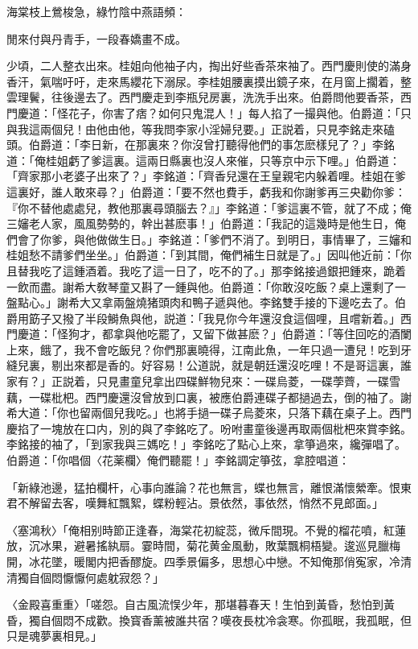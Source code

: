 海棠枝上鶯梭急，綠竹陰中燕語頻：　

閒來付與丹青手，一段春嬌畫不成。

少頃，二人整衣出來。桂姐向他袖子内，掏出好些香茶來袖了。西門慶則使的滿身香汗，氣喘吁吁，走來馬纓花下溺尿。李桂姐腰裏摸出鏡子來，在月窗上擱着，整雲理鬢，往後邊去了。西門慶走到李瓶兒房裏，洗洗手出來。伯爵問他要香茶，西門慶道：「怪花子，你害了痞？如何只鬼混人！」每人掐了一撮與他。伯爵道：「只與我這兩個兒！由他由他，等我問李家小淫婦兒要。」正説着，只見李銘走來磕頭。伯爵道：「李日新，在那裏來？你沒曾打聽得他們的事怎麽樣兒了？」李銘道：「俺桂姐虧了爹這裏。這兩日縣裏也沒人來催，只等京中示下哩。」伯爵道：「齊家那小老婆子出來了？」李銘道：「齊香兒還在王皇親宅内躲着哩。桂姐在爹這裏好，誰人敢來尋？」伯爵道：「要不然也費手，虧我和你謝爹再三央勸你爹：『你不替他處處兒，教他那裏尋頭腦去？』」李銘道：「爹這裏不管，就了不成；俺三嬸老人家，風風勢勢的，幹出甚麽事！」伯爵道：「我記的這幾時是他生日，俺們會了你爹，與他做做生日。」李銘道：「爹們不消了。到明日，事情畢了，三嬸和桂姐愁不請爹們坐坐。」伯爵道：「到其間，俺們補生日就是了。」因叫他近前：「你且替我吃了這鍾酒着。我吃了這一日了，吃不的了。」那李銘接過銀把鍾來，跪着一飲而盡。謝希大敎琴童又斟了一鍾與他。伯爵道：「你敢沒吃飯？桌上還剩了一盤點心。」謝希大又拿兩盤燒猪頭肉和鴨子遞與他。李銘雙手接的下邊吃去了。伯爵用筯子又撥了半段鰣魚與他，説道：「我見你今年還沒食這個哩，且嚐新着。」西門慶道：「怪狗才，都拿與他吃罷了，又留下做甚麽？」伯爵道：「等住回吃的酒闌上來，餓了，我不會吃飯兒？你們那裏曉得，江南此魚，一年只過一遭兒！吃到牙縫兒裏，剔出來都是香的。好容易！公道説，就是朝廷還沒吃哩！不是哥這裏，誰家有？」正説着，只見畫童兒拿出四碟鮮物兒來：一碟烏菱，一碟荸薺，一碟雪藕，一碟枇杷。西門慶還沒曾放到口裏，被應伯爵連碟子都撾過去，倒的袖了。謝希大道：「你也留兩個兒我吃。」也將手撾一碟子烏菱來，只落下藕在桌子上。西門慶掐了一塊放在口内，別的與了李銘吃了。吩咐畫童後邊再取兩個枇杷來賞李銘。李銘接的袖了，「到家我與三媽吃！」李銘吃了點心上來，拿箏過來，纔彈唱了。伯爵道：「你唱個〈花薬欄〉俺們聽罷！」李銘調定箏弦，拿腔唱道：

「新綠池邊，猛拍欄杆，心事向誰論？花也無言，蝶也無言，離恨滿懷縈牽。恨東君不解留去客，嘆舞紅飄絮，蝶粉輕沾。景依然，事依然，悄然不見郎面。」

〈塞鴻秋〉「俺相别時節正逢春，海棠花初綻蕊，微斥間現。不覺的榴花噴，紅蓮放，沉冰果，避暑搖紈扇。霎時間，菊花黄金風動，敗葉飄桐梧變。逡巡見臘梅開，冰花墜，暖閣内把香醪旋。四季景偏多，思想心中戀。不知俺那俏寃家，冷清清獨自個悶懨懨何處躭寂怨？」

〈金殿喜重重〉「嗟怨。自古風流悮少年，那堪暮春天！生怕到黃昏，愁怕到黃昏，獨自個悶不成歡。換寳香薰被誰共宿？嘆夜長枕冷衾寒。你孤眠，我孤眠，但只是魂夢裏相見。」


